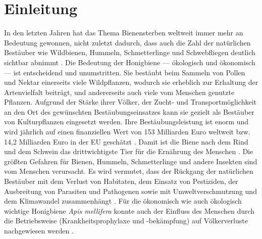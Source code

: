 \section{Einleitung}

In den letzten Jahren hat das Thema Bienensterben weltweit immer mehr an Bedeutung gewonnen, nicht zuletzt dadurch, dass auch die Zahl der natürlichen Bestäuber wie Wildbienen, Hummeln, Schmetterlinge und Schwebfliegen deutlich sichtbar abnimmt \citep{hallmann2017}. Die Bedeutung der Honigbiene --- ökologisch und ökonomisch --- ist entscheidend und unumstritten. Sie bestäubt beim Sammeln von Pollen und Nektar einerseits viele Wildpflanzen, wodurch sie erheblich zur Erhaltung der Artenvielfalt beiträgt, und andererseits auch viele vom Menschen genutzte Pflanzen. Aufgrund der Stärke ihrer Völker, der Zucht- und Transportmöglichkeit an den Ort des gewünschten Bestäubungseinsatzes kann sie gezielt als Bestäuber von Kulturpflanzen eingesetzt werden. Ihre Bestäubungsleistung ist enorm und wird jährlich auf einen finanziellen Wert von 153 Milliarden Euro weltweit bzw. 14,2 Milliarden Euro in der EU geschätzt \citep{gallai2009}. Damit ist die Biene nach dem Rind und dem Schwein das drittwichtigste Tier für die Ernährung des Menschen \citep{kearns1998}.
\newline
Die größten Gefahren für Bienen, Hummeln, Schmetterlinge und andere Insekten sind vom Menschen verursacht. Es wird vermutet, dass der Rückgang der natürlichen Bestäuber mit dem Verlust von Habitaten, dem Einsatz von Pestiziden, der Ausbreitung von Parasiten und Pathogenen sowie mit Umweltverschmutzung und dem Klimawandel zusammenhängt \citep{biesmeijer2006, cameron2011, vanengelsdorp2011, cornman2012, goulson2013, steinhauer2014, steinhauer2018, vanderzee2014, clermont2015, clermont2015, woodcock2016, belsky2019}. Für die ökonomisch wie auch ökologisch wichtige Honigbiene \textit{Apis mellifera} konnte auch der Einfluss des Menschen durch die Betriebsweise (Krankheitsprophylaxe und -bekämpfung) auf Völkerverluste nachgewiesen werden \citep{jacques2017}.
\newline
